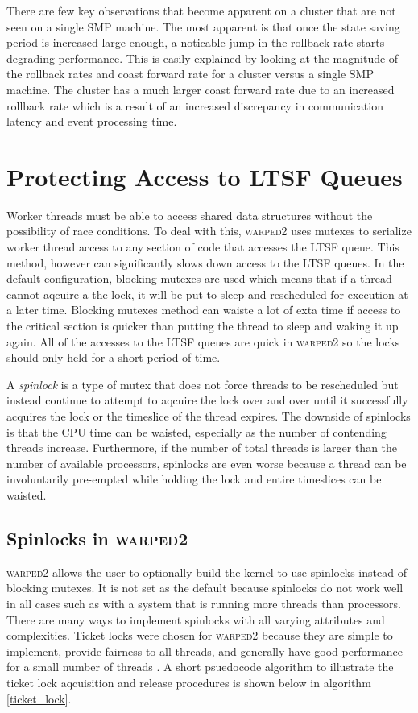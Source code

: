 \documentclass[11pt]{book}
\begin{document}
There are few key observations that become apparent on a cluster that are not seen on a single
SMP machine. The most apparent is that once the state saving period is increased large enough,
a noticable jump in the rollback rate starts degrading performance. This is easily explained
by looking at the magnitude of the rollback rates and coast forward rate for a cluster versus
a single SMP machine. The cluster has a much larger coast forward rate due to an increased rollback
rate which is a result of an increased discrepancy in communication latency and event processing time.

\section{Protecting Access to LTSF Queues}

Worker threads must be able to access shared data structures without the possibility of
race conditions. To deal with this, \textsc{warped2} uses mutexes to serialize worker thread
access to any section of code that accesses the LTSF queue. This method, however can significantly
slows down access to the LTSF queues. In the default configuration, blocking mutexes are used
which means that if a thread cannot aqcuire a the lock, it will be put to sleep and rescheduled
for execution at a later time. Blocking mutexes method can waiste a lot of exta time if access to the
critical section is quicker than putting the thread to sleep and waking it up again. All of the
accesses to the LTSF queues are quick in \textsc{warped2} so the locks should only held for a short
period of time.

A \emph{spinlock} is a type of mutex that does not force threads to be rescheduled but
instead continue to attempt to aqcuire the lock over and over until it successfully acquires
the lock or the timeslice of the thread expires. The downside of spinlocks is that the CPU time
can be waisted, especially as the number of contending threads increase. Furthermore, if the
number of total threads is larger than the number of available processors, spinlocks are
even worse because a thread can be involuntarily pre-empted while holding the lock and entire
timeslices can be waisted.

\subsection{Spinlocks in \textsc{warped2}}

\textsc{warped2} allows the user to optionally build the kernel to use spinlocks instead of
blocking mutexes. It is not set as the default because spinlocks do not work well in all cases
such as with a system that is running more threads than processors.
There are many ways to implement spinlocks with all varying attributes and complexities.
Ticket locks were chosen for \textsc{warped2} because they are simple to implement, provide
fairness to all threads, and generally have good performance for a small number of threads
\cite{lockless-10}. A short psuedocode algorithm to illustrate the ticket lock aqcuisition and
release procedures is shown below in algorithm \ref{ticket_lock}.
\end{document}
